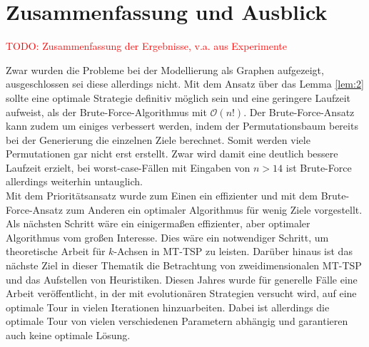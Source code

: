 \documentclass[german,version-2019-11]{uzl-thesis}
\begin{document}
\chapter{Zusammenfassung und Ausblick}
\textcolor{red}{TODO: Zusammenfassung der Ergebnisse, v.a. aus Experimente} 

\noindent
Zwar wurden die Probleme bei der Modellierung als Graphen aufgezeigt, ausgeschlossen sei diese allerdings nicht. Mit dem Ansatz über das Lemma \ref{lem:2} sollte eine optimale Strategie definitiv möglich sein und eine geringere Laufzeit aufweist, als der Brute-Force-Algorithmus mit $\mathcal{O}(n!)$. Der Brute-Force-Ansatz kann zudem um einiges verbessert werden, indem der Permutationsbaum bereits bei der Generierung die einzelnen Ziele berechnet. Somit werden viele Permutationen gar nicht erst erstellt. Zwar wird damit eine deutlich bessere Laufzeit erzielt, bei worst-case-Fällen mit Eingaben von $n>14$ ist Brute-Force allerdings weiterhin untauglich.\\
Mit dem Prioritätsansatz wurde zum Einen ein effizienter und mit dem Brute-Force-Ansatz zum Anderen ein optimaler Algorithmus für wenig Ziele vorgestellt. Als nächsten Schritt wäre ein einigermaßen effizienter, aber optimaler Algorithmus vom großen Interesse. Dies wäre ein notwendiger Schritt, um theoretische Arbeit für $k$-Achsen in MT-TSP zu leisten. Darüber hinaus ist das nächste Ziel in dieser Thematik die Betrachtung von zweidimensionalen MT-TSP und das Aufstellen von Heuristiken.
Diesen Jahres wurde für generelle Fälle eine Arbeit\cite{moraes} veröffentlicht, in der mit evolutionären Strategien versucht wird, auf eine optimale Tour in vielen Iterationen hinzuarbeiten. Dabei ist allerdings die optimale Tour von vielen verschiedenen Parametern abhängig und garantieren auch keine optimale Lösung. 
\end{document}
